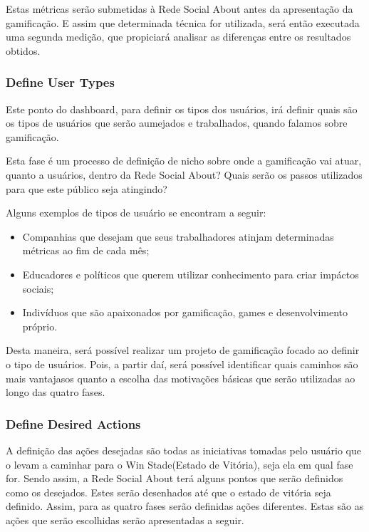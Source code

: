 Estas métricas serão submetidas à Rede Social About antes da apresentação da
gamificação. E assim que determinada técnica for utilizada, será então executada uma
segunda medição, que propiciará analisar as diferenças entre os resultados obtidos.

\subsubsection{Define User Types}
\label{sub:define_user_types}
Este ponto do dashboard, para definir os tipos dos usuários, irá
definir quais são os tipos de usuários que serão aumejados e trabalhados, quando
falamos sobre gamificação.

Esta fase é um processo de definição de nicho sobre onde a gamificação vai atuar, quanto a
usuários, dentro da Rede Social About? Quais serão os passos utilizados para que este público
seja atingindo?

Alguns exemplos de tipos de usuário se encontram a seguir:

\begin{itemize}
    \item Companhias que desejam que seus trabalhadores atinjam determinadas métricas
        ao fim de cada mês;
    \item Educadores e políticos que querem utilizar conhecimento para criar impáctos
        sociais;
    \item Indivíduos que são apaixonados por gamificação, games e desenvolvimento próprio.
\end{itemize}
 
Desta maneira, será possível realizar um projeto de gamificação focado ao definir o tipo
de usuários. Pois, a partir daí, será possível identificar quais caminhos são mais vantajasos
quanto a escolha das motivações básicas que serão utilizadas ao longo das quatro fases.

\subsubsection{Define Desired Actions}
\label{sub:define_desired_actions}
A definição das ações desejadas são todas as iniciativas tomadas pelo usuário que o 
levam a caminhar para
o Win Stade(Estado de Vitória), seja ela em qual fase for. Sendo assim, a Rede Social
About terá alguns pontos que serão definidos como os desejados. Estes serão desenhados
até que o estado de vitória seja definido. Assim, para as quatro fases serão definidas
ações diferentes. Estas são as  ações que serão escolhidas serão apresentadas
a seguir.

